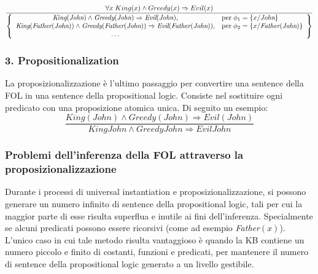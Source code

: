 \[\frac{\forall x \; King(x) \land Greedy(x) \Rightarrow Evil(x)}{\left\{ \begin{array}{c l}
	\textit{King}(\textit{John}) \land \textit{Greedy}(\textit{John}) \Rightarrow \textit{Evil}(\textit{John}), & \text{per} \; \phi_1 = \left\{ x / \textit{John} \right\} \\
	\textit{King}(\textit{Father}(\textit{John})) \land \textit{Greedy}(\textit{Father}(\textit{John})) \Rightarrow \textit{Evil}(\textit{Father}(\textit{John})), & \text{per} \; \phi_2 = \left\{ x / \textit{Father}(\textit{John}) \right\} \\
	\dots
\end{array} \right\}}\]

\subsubsection*{3. Propositionalization}
La proposizionalizzazione è l'ultimo passaggio per convertire una sentence della FOL in una sentence della propositional logic.
Consiste nel sostituire ogni predicato con una proposizione atomica unica. Di seguito un esempio:
\[\frac{\textit{King}(John) \land \textit{Greedy}(John) \Rightarrow \textit{Evil}(John)}{KingJohn \land GreedyJohn \Rightarrow EvilJohn}\]

\subsubsection*{Problemi dell'inferenza della FOL attraverso la proposizionalizzazione}
Durante i processi di universal instantiation e proposizionalizzazione, si possono generare un numero infinito di sentence
della propositional logic, tali per cui la maggior parte di esse risulta superflua e inutile ai fini dell'inferenza. Specialmente
se alcuni predicati possono essere ricorsivi (come ad esempio \textit{Father}\((x)\)). L'unico caso in cui tale metodo risulta
vantaggioso è quando la KB contiene un numero piccolo e finito di costanti, funzioni e predicati, per mantenere il numero di
sentence della propositional logic generato a un livello gestibile.

